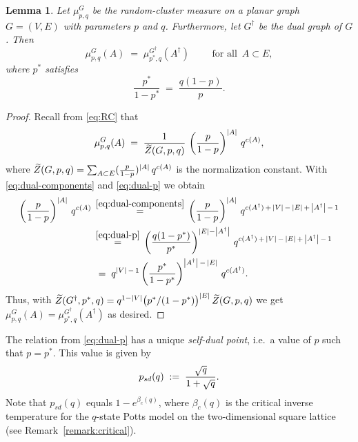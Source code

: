 \documentclass{dis}
\newtheorem{lemma}[theorem]{Lemma}
\theoremstyle{citing}
\begin{document}
\begin{lemma}\label{lemma:RC-dual}
Let $\mu_{p,q}^G$ be the random-cluster measure on a planar 
graph $G=(V,E)$ with parameters $p$ and $q$. 
Furthermore, let $G^\dag$ be the dual graph of $G$. 
Then
\[
\mu_{p,q}^G(A) \;=\; \mu_{p^*,q}^{G^\dag}(A^\dag) 
\qquad \text{ for all }\, A\subset E,
\]
where $p^*$ satisfies 
\begin{equation}\label{eq:dual-p}
\frac{p^*}{1-p^*} \;=\; \frac{q(1-p)}{p}.
\end{equation}
\end{lemma}
\vspace{2mm}
\begin{proof}
Recall from \eqref{eq:RC} that
\[
\mu^G_{p,q}(A) \;=\; 
\frac1{{\,\raisebox{2pt}{ ${\widetilde{{}}}$ }\mkern-15mu Z}(G,p,q)}\,
\left(\frac{p}{1-p}\right)^{{\left\vert {A} \right\vert}}\,q^{c(A)}, 
\]
where 
${\,\raisebox{2pt}{ ${\widetilde{{}}}$ }\mkern-15mu Z}(G,p,q)=\sum_{A\subset E}(\frac{p}{1-p})^{{\left\vert {A} \right\vert}}\,q^{c(A)}$ 
is the normalization constant.
With \eqref{eq:dual-components} and \eqref{eq:dual-p} we obtain
\[\begin{split}
\left(\frac{p}{1-p}\right)^{{\left\vert {A} \right\vert}}\,q^{c(A)} 
\,&\stackrel{\eqref{eq:dual-components}}{=}\, 
	\left(\frac{p}{1-p}\right)^{{\left\vert {A} \right\vert}}\,
		q^{c(A^\dag)\,+\, {\left\vert {V} \right\vert}\,-\,{\left\vert {E} \right\vert} \,+\,{\left\vert {A^\dag} \right\vert}\,-\, 1} \\
\,&\stackrel{\eqref{eq:dual-p}}{=}\, 
	\left(\frac{q(1-p^*)}{p^*}\right)^{{\left\vert {E} \right\vert}-{\left\vert {A^\dag} \right\vert}}\,
		q^{c(A^\dag)\,+\, {\left\vert {V} \right\vert}\,-\,{\left\vert {E} \right\vert} \,+\,{\left\vert {A^\dag} \right\vert}\,-\, 1} \\
\,&\;=\; q^{{\left\vert {V} \right\vert} \,-\, 1}
	\left(\frac{p^*}{1-p^*}\right)^{{\left\vert {A^\dag} \right\vert} \,-\, {\left\vert {E} \right\vert}}\,
		q^{c(A^\dag)}.
\end{split}\]
Thus, with ${\,\raisebox{2pt}{ ${\widetilde{{}}}$ }\mkern-15mu Z}(G^\dag,p^*,q)=
	q^{1-{\left\vert {V} \right\vert}}\bigl(p^*/(1-p^*)\bigr)^{{\left\vert {E} \right\vert}}\,{\,\raisebox{2pt}{ ${\widetilde{{}}}$ }\mkern-15mu Z}(G,p,q)$ 
we get $\mu^G_{p,q}(A)=\mu^{G^\dag}_{p^*,q}(A^\dag)$ as desired. 
\end{proof}
\vspace{1mm}

The relation from \eqref{eq:dual-p} has a unique
\emph{self-dual point}, i.e.~a value of $p$ such that $p=p^*$.
This value is given by 
\begin{equation}\label{eq:self-dual-p}
p_{sd}(q) \;:=\; \frac{\sqrt{q}}{1+\sqrt{q}}.
\vspace{2mm}
\end{equation}
Note that $p_{sd}(q)$ equals $1-e^{\beta_c(q)}$, where $\beta_c(q)$ 
is the critical inverse temperature for the $q$-state Potts model 
on the two-dimensional square lattice 
(see Remark~\ref{remark:critical}).
\end{document}
